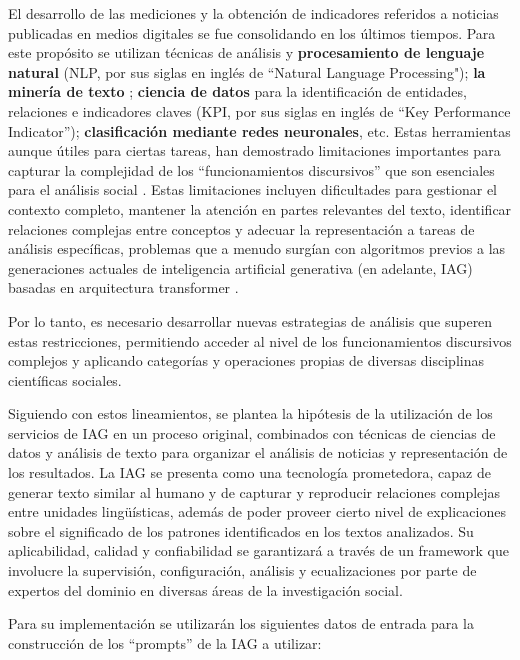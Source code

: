 \documentclass[12pt]{report}
\begin{document}
El desarrollo de las mediciones y la obtención de indicadores referidos a noticias publicadas en medios digitales se fue consolidando en los últimos tiempos. Para este propósito se utilizan técnicas de análisis y \textbf{procesamiento de lenguaje natural} (NLP, por sus siglas en inglés de ``Natural Language Processing"); \textbf{la minería de texto} \citep{tan:1999, hotho:2005}; \textbf{ciencia de datos} para la identificación de entidades, relaciones e indicadores claves (KPI, por sus siglas en inglés de ``Key Performance Indicator''); \textbf{clasificación mediante redes neuronales}, etc. Estas herramientas aunque útiles para ciertas tareas, han demostrado limitaciones importantes para capturar la complejidad de los ``funcionamientos discursivos'' que son esenciales para el análisis social \citep{gindin:2018}. Estas limitaciones incluyen dificultades para gestionar el contexto completo, mantener la atención en partes relevantes del texto, identificar relaciones complejas entre conceptos y adecuar la representación a tareas de análisis específicas, problemas que a menudo surgían con algoritmos previos a las generaciones actuales de inteligencia artificial generativa (en adelante, IAG) basadas en arquitectura transformer \citep{vaswani:2017}.

Por lo tanto, es necesario desarrollar nuevas estrategias de análisis que superen estas restricciones, permitiendo acceder al nivel de los funcionamientos discursivos complejos y aplicando categorías y operaciones propias de diversas disciplinas científicas sociales.

Siguiendo con estos lineamientos, se plantea la hipótesis de la utilización de los servicios de  IAG en un proceso original, combinados con técnicas de ciencias de datos y análisis de texto para organizar el análisis de noticias y representación de los resultados. La IAG se presenta como una tecnología prometedora, capaz de generar texto similar al humano y de capturar y reproducir relaciones complejas entre unidades lingüísticas, además de poder proveer cierto nivel de explicaciones sobre el significado de los patrones identificados en los textos analizados. Su aplicabilidad, calidad y confiabilidad se garantizará a través de un framework que involucre la supervisión, configuración, análisis y ecualizaciones por parte de expertos del dominio en diversas áreas de la investigación social.


Para su implementación se utilizarán los siguientes datos de entrada para la construcción de los ``prompts'' de la IAG a utilizar:
\end{document}
